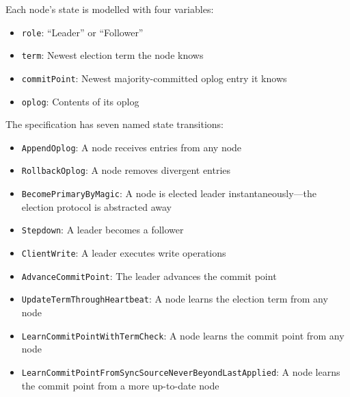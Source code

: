 \documentclass{vldb}
\begin{document}
Each node's state is modelled with four variables:

\begin{itemize}[itemsep=-0.5ex]
\item \texttt{role}: ``Leader'' or ``Follower''
\item \texttt{term}: Newest election term the node knows
\item \texttt{commitPoint}: Newest majority-committed oplog entry it knows
\item \texttt{oplog}: Contents of its oplog
\end{itemize}

\vspace{10 mm}

The specification has seven named state transitions:

\begin{itemize}[itemsep=-0.5ex]
\item \texttt{AppendOplog}: A node receives entries from any node
\item \texttt{RollbackOplog}: A node removes divergent entries
\item \texttt{BecomePrimaryByMagic}: A node is elected leader instantaneously---the election protocol is abstracted away
\item \texttt{Stepdown}: A leader becomes a follower
\item \texttt{ClientWrite}: A leader executes write operations
\item \texttt{AdvanceCommitPoint}: The leader advances the commit point
\item \texttt{UpdateTermThroughHeartbeat}: A node learns the election term from any node
\item \texttt{LearnCommitPointWithTermCheck}: A node learns the commit point from any node
\item \texttt{LearnCommitPointFromSyncSource\-Never\-Beyond\-Last\-Applied}: A node learns the commit point from a more up-to-date node
\end{itemize}


\end{document}
